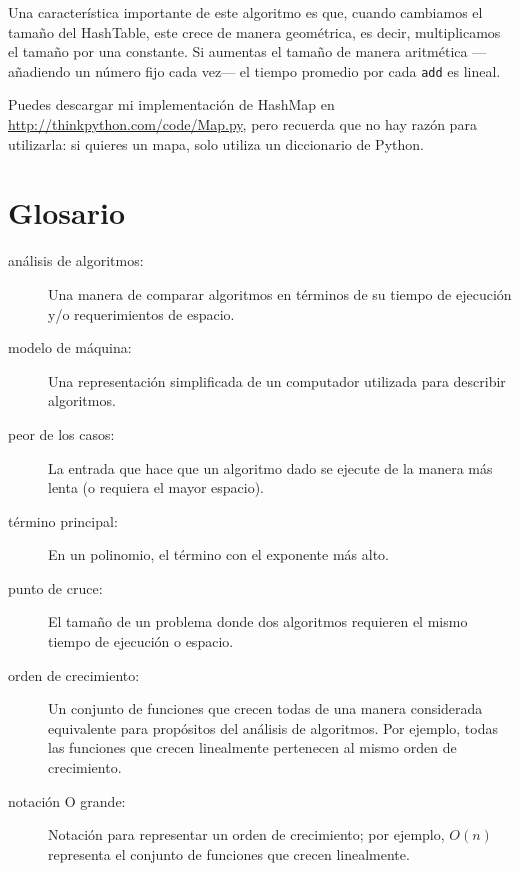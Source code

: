\documentclass[10pt]{book}
\begin{document}
Una característica importante de este algoritmo es que, cuando cambiamos el tamaño del
HashTable, este crece de manera geométrica, es decir, multiplicamos el tamaño por una
constante.  Si aumentas el tamaño de manera
aritmética ---añadiendo un número fijo cada vez--- el tiempo promedio
por cada {\tt add} es lineal.

Puedes descargar mi implementación de HashMap en
\url{http://thinkpython.com/code/Map.py}, pero recuerda que no hay
razón para utilizarla: si quieres un mapa, solo utiliza un diccionario de Python.

\section{Glosario}

\begin{description}

\item[análisis de algoritmos:] Una manera de comparar algoritmos en términos de
su tiempo de ejecución y/o requerimientos de espacio.

\item[modelo de máquina:] Una representación simplificada de un computador utilizada
para describir algoritmos.

\item[peor de los casos:] La entrada que hace que un algoritmo dado se ejecute de la manera más lenta (o
requiera el mayor espacio).

\item[término principal:] En un polinomio, el término con el exponente más alto.

\item[punto de cruce:] El tamaño de un problema donde dos algoritmos requieren
el mismo tiempo de ejecución o espacio.

\item[orden de crecimiento:] Un conjunto de funciones que crecen todas de una manera
considerada equivalente para propósitos del análisis de algoritmos.
Por ejemplo, todas las funciones que crecen linealmente pertenecen al mismo
orden de crecimiento.

\item[notación O grande:] Notación para representar un orden de crecimiento;
por ejemplo, $O(n)$ representa el conjunto de funciones que crecen
linealmente.


\end{description}
\end{document}
